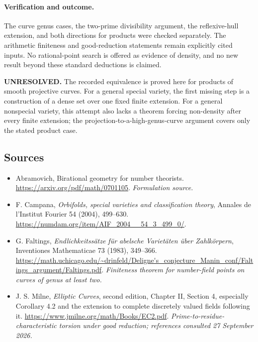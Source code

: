 \documentclass[11pt]{article}
\begin{document}
\paragraph{Verification and outcome.}
The curve genus cases, the two-prime divisibility argument, the reflexive-hull extension, and both directions for products were checked separately. The arithmetic finiteness and good-reduction statements remain explicitly cited inputs. No rational-point search is offered as evidence of density, and no new result beyond these standard deductions is claimed.

\textbf{UNRESOLVED.} The recorded equivalence is proved here for products of smooth projective curves. For a general special variety, the first missing step is a construction of a dense set over one fixed finite extension. For a general nonspecial variety, this attempt also lacks a theorem forcing non-density after every finite extension; the projection-to-a-high-genus-curve argument covers only the stated product case.

\subsection{Sources}
\begin{itemize}
\item[S1]Abramovich, Birational geometry for number theorists.
\url{https://arxiv.org/pdf/math/0701105}.
\textit{Formulation source.}
\item[E1]F. Campana, \emph{Orbifolds, special varieties and classification theory}, Annales de l'Institut Fourier 54 (2004), 499--630.
\url{https://numdam.org/item/AIF_2004__54_3_499_0/}.
\item[E2]G. Faltings, \emph{Endlichkeitss\"atze f\"ur abelsche Variet\"aten \"uber Zahlk\"orpern}, Inventiones Mathematicae 73 (1983), 349--366.
\url{https://math.uchicago.edu/~drinfeld/Deligne's_conjecture_Manin_conf/Faltings_argument/Faltings.pdf}.
\textit{Finiteness theorem for number-field points on curves of genus at least two.}
\item[E3]J. S. Milne, \emph{Elliptic Curves}, second edition, Chapter II, Section 4, especially Corollary 4.2 and the extension to complete discretely valued fields following it.
\url{https://www.jmilne.org/math/Books/EC2.pdf}.
\textit{Prime-to-residue-characteristic torsion under good reduction; references consulted 27 September 2026.}
\end{itemize}
\end{document}
